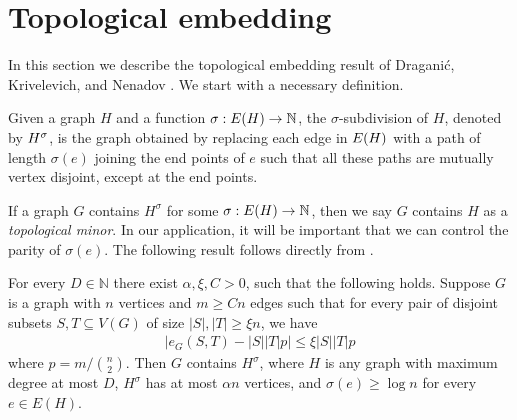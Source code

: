 \documentclass[11pt]{article}
\begin{document}




\section{Topological embedding}
\label{sec:embed-machinery}

In this section we describe the topological embedding result of Dragani\'c, Krivelevich, and Nenadov \cite{draganic22rolling}. We start with a necessary definition.

\begin{definition}\label{def:subdivisions}
Given a graph $H$ and a function $\sigma: E(H) \rightarrow \mathbb{N}$, the $\sigma$-subdivision of $H$, denoted by ${H}^{\sigma}$, is the graph obtained by replacing each edge in $E(H)$ with a path of length $\sigma(e)$ joining the end points of $e$ such that all these paths are mutually vertex disjoint, except at the end points.
\end{definition}

If a graph $G$ contains $H^{\sigma}$ for some $\sigma: E(H) \to \mathbb{N}$, then we say $G$ contains $H$ as a \emph{topological minor}. In our application, it will be important that we can control the parity of $\sigma(e)$. The following result follows directly from \cite[Theorem 1]{draganic22rolling}. 


\begin{theorem} \label{thm:embedding_top}
For every $D \in \mathbb{N}$ there exist $\alpha, \xi, C > 0$, such that the following holds. Suppose $G$ is a graph with $n$ vertices and $m \ge Cn$ edges such that for every pair of disjoint subsets $S, T \subseteq V(G)$ of size $|S|, |T| \ge \xi n$, we have
\begin{align*}
  \bigl| e_{G}(S, T) - |S||T|p \bigr| \le \xi |S||T| p \label{eq:props}
\end{align*}
where $p = m / \binom{n}{2}$. Then $G$ contains $H^{\sigma}$, where $H$ is any graph with maximum degree at most $D$, $H^\sigma$ has at most $\alpha n$ vertices, and $\sigma(e) \ge \log n$ for every $e \in E(H)$.
\end{theorem}
\end{document}
